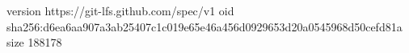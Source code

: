 version https://git-lfs.github.com/spec/v1
oid sha256:d6ea6aa907a3ab25407c1c019e65e46a456d0929653d20a0545968d50cefd81a
size 188178
